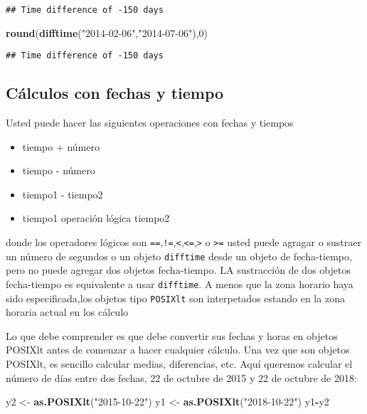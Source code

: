 \documentclass[]{article}
\newenvironment{Shaded}{\begin{snugshade}}{\end{snugshade}}
\newcommand{\KeywordTok}[1]{\textcolor[rgb]{0.13,0.29,0.53}{\textbf{#1}}}
\newcommand{\DecValTok}[1]{\textcolor[rgb]{0.00,0.00,0.81}{#1}}
\newcommand{\StringTok}[1]{\textcolor[rgb]{0.31,0.60,0.02}{#1}}
\newcommand{\OperatorTok}[1]{\textcolor[rgb]{0.81,0.36,0.00}{\textbf{#1}}}
\newcommand{\NormalTok}[1]{#1}
\begin{document}
\begin{verbatim}
## Time difference of -150 days
\end{verbatim}

\begin{Shaded}
\begin{Highlighting}[]
\KeywordTok{round}\NormalTok{(}\KeywordTok{difftime}\NormalTok{(}\StringTok{"2014-02-06"}\NormalTok{,}\StringTok{"2014-07-06"}\NormalTok{),}\DecValTok{0}\NormalTok{)}
\end{Highlighting}
\end{Shaded}

\begin{verbatim}
## Time difference of -150 days
\end{verbatim}

\subsection{Cálculos con fechas y
tiempo}\label{cuxe1lculos-con-fechas-y-tiempo}

Usted puede hacer las siguientes operaciones con fechas y tiempos

\begin{itemize}
\item
  tiempo + número
\item
  tiempo - número
\item
  tiempo1 - tiempo2
\item
  tiempo1 operación lógica tiempo2
\end{itemize}

donde los operadores lógicos son
\texttt{==},\texttt{!=},\texttt{\textless{}},\texttt{\textless{}=},\texttt{\textgreater{}}
o \texttt{\textgreater{}=} usted puede agragar o sustraer un número de
segundos o un objeto \texttt{difftime} desde un objeto de fecha-tiempo,
pero no puede agregar dos objetos fecha-tiempo. LA sustracción de dos
objetos fecha-tiempo es equivalente a usar \texttt{difftime}. A menos
que la zona horario haya sido especificada,los objetos tipo
\texttt{POSIXlt} son interpetados estando en la zona horaria actual en
los cálculo

Lo que debe comprender es que debe convertir sus fechas y horas en
objetos POSIXlt antes de comenzar a hacer cualquier cálculo. Una vez que
son objetos POSIXlt, es sencillo calcular medias, diferencias, etc. Aquí
queremos calcular el número de días entre dos fechas, 22 de octubre de
2015 y 22 de octubre de 2018:

\begin{Shaded}
\begin{Highlighting}[]
\NormalTok{y2 <-}\StringTok{ }\KeywordTok{as.POSIXlt}\NormalTok{(}\StringTok{"2015-10-22"}\NormalTok{)}
\NormalTok{y1 <-}\StringTok{ }\KeywordTok{as.POSIXlt}\NormalTok{(}\StringTok{"2018-10-22"}\NormalTok{)}
\NormalTok{y1}\OperatorTok{-}\NormalTok{y2}
\end{Highlighting}
\end{Shaded}
\end{document}
